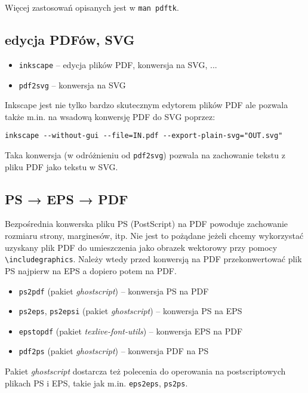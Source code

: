 \documentclass[fontSize=10pt, rmargin=3cm, extra]{pdfArticle}
\begin{document}
Więcej zastosowań opisanych jest w \Verb$man pdftk$.


\subsection{edycja PDFów, SVG}

\begin{itemize}
	\item \Verb$inkscape$ – edycja plików PDF, konwersja na SVG, ...
	\item \Verb$pdf2svg$ – konwersja na SVG
\end{itemize}

Inkscape jest nie tylko bardzo skutecznym edytorem plików PDF ale pozwala także m.in. na wsadową konwersję PDF do SVG poprzez:
\begin{verbatim}
inkscape --without-gui --file=IN.pdf --export-plain-svg="OUT.svg"
\end{verbatim}
Taka konwersja (w odróżnieniu od \Verb$pdf2svg$) pozwala na zachowanie tekstu z pliku PDF jako tekstu w SVG.

\subsection{PS → EPS → PDF}

Bezpośrednia konwerska pliku PS (PostScript) na PDF powoduje zachowanie rozmiaru strony, marginesów, itp.
Nie jest to pożądane jeżeli chcemy wykorzystać uzyskany plik PDF do umieszczenia jako obrazek wektorowy przy pomocy \Verb$\includegraphics$.
Należy wtedy przed konwersją na PDF przekonwertować plik PS najpierw na EPS a dopiero potem na PDF.

\begin{itemize}
	\item \Verb$ps2pdf$ (pakiet \textit{ghostscript}) – konwersja PS na PDF
	\item \Verb$ps2eps$, \Verb$ps2epsi$ (pakiet \textit{ghostscript}) – konwersja PS na EPS
	\item \Verb$epstopdf$ (pakiet \textit{texlive-font-utils}) – konwersja EPS na PDF
	\item \Verb$pdf2ps$ (pakiet \textit{ghostscript}) – konwersja PDF na PS
\end{itemize}

Pakiet \textit{ghostscript} dostarcza też polecenia do operowania na postscriptowych plikach PS i EPS, takie jak m.in. \Verb$eps2eps$, \Verb$ps2ps$.
\end{document}
